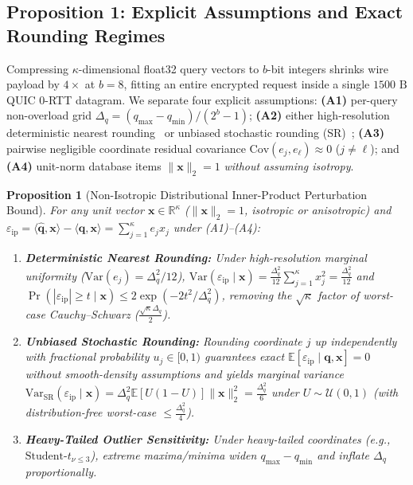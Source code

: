 \documentclass[10pt,journal,compsoc]{IEEEtran}
\newtheorem{proposition}{Proposition}
\begin{document}
\subsection{Proposition 1: Explicit Assumptions and Exact Rounding Regimes}
Compressing $\kappa$-dimensional float32 query vectors to $b$-bit integers shrinks wire payload by $4\times$ at $b=8$, fitting an entire encrypted request inside a single $1500\text{ B}$ QUIC 0-RTT datagram. We separate four explicit assumptions: \textbf{(A1)} per-query non-overload grid $\Delta_q = (q_{\max}-q_{\min})/(2^b-1)$; \textbf{(A2)} either high-resolution deterministic nearest rounding~\cite{gray1998quantization} or unbiased stochastic rounding (SR)~\cite{gupta2015stochastic}; \textbf{(A3)} pairwise negligible coordinate residual covariance $\text{Cov}(e_j, e_\ell) \approx 0$ ($j \ne \ell$); and \textbf{(A4)} unit-norm database items $\|\mathbf{x}\|_2 = 1$ \emph{without assuming isotropy}.

\begin{proposition}[Non-Isotropic Distributional Inner-Product Perturbation Bound]\label{prop:quant}
For any unit vector $\mathbf{x} \in \mathbb{R}^\kappa$ ($\|\mathbf{x}\|_2=1$, isotropic or anisotropic) and $\varepsilon_{\text{ip}} = \langle \hat{\mathbf{q}}, \mathbf{x}\rangle - \langle \mathbf{q}, \mathbf{x}\rangle = \sum_{j=1}^\kappa e_j x_j$ under (A1)--(A4):
\begin{enumerate}
    \item \textbf{Deterministic Nearest Rounding:} Under high-resolution marginal uniformity ($\text{Var}(e_j)=\Delta_q^2/12$), $\text{Var}(\varepsilon_{\text{ip}} \mid \mathbf{x}) = \frac{\Delta_q^2}{12}\sum_{j=1}^\kappa x_j^2 = \frac{\Delta_q^2}{12}$ and $\Pr(|\varepsilon_{\text{ip}}| \ge t \mid \mathbf{x}) \le 2\exp(-2t^2/\Delta_q^2)$, removing the $\sqrt{\kappa}$ factor of worst-case Cauchy--Schwarz ($\frac{\sqrt{\kappa}\Delta_q}{2}$).
    \item \textbf{Unbiased Stochastic Rounding:} Rounding coordinate $j$ up independently with fractional probability $u_j \in [0,1)$ guarantees exact $\mathbb{E}[\varepsilon_{\text{ip}} \mid \mathbf{q}, \mathbf{x}] = 0$ without smooth-density assumptions and yields marginal variance $\text{Var}_{\text{SR}}(\varepsilon_{\text{ip}} \mid \mathbf{x}) = \Delta_q^2 \mathbb{E}[U(1-U)]\|\mathbf{x}\|_2^2 = \frac{\Delta_q^2}{6}$ under $U \sim \mathcal{U}(0,1)$ (with distribution-free worst-case $\le \frac{\Delta_q^2}{4}$).
    \item \textbf{Heavy-Tailed Outlier Sensitivity:} Under heavy-tailed coordinates (e.g., $\text{Student-}t_{\nu \le 3}$), extreme maxima/minima widen $q_{\max}-q_{\min}$ and inflate $\Delta_q$ proportionally.
\end{enumerate}
\end{proposition}
\end{document}
